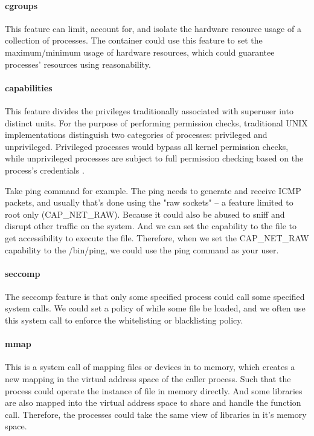 \documentclass[12pt,a4paper]{IEEEconf}
\begin{document}
\paragraph{cgroups}
This feature can limit, account for, and isolate the hardware resource usage of a
collection of processes\cite{cgroup_wiki}.
The container could use this feature to set the maximum/minimum usage of hardware
resources, which could guarantee processes' resources using reasonability.

\paragraph{capabilities}
This feature divides the privileges traditionally associated with superuser into
distinct units. For the purpose of performing permission checks, traditional UNIX
implementations distinguish two categories of processes: privileged and unprivileged.
Privileged processes would bypass all kernel permission checks, while unprivileged
processes are subject to full permission checking based on the process's credentials
\cite{capabilities}.

Take ping command for example. The ping needs to generate and receive ICMP packets,
and usually that's done using the "raw sockets" – a feature limited to root only
(CAP\_NET\_RAW). Because it could also be abused to sniff and disrupt other traffic
on the system. And we can set the capability to the file to get accessibility to
execute the file.
Therefore, when we set the CAP\_NET\_RAW capability to the /bin/ping, we could use
the ping command as your user.

\paragraph{seccomp}
The seccomp feature is that only some specified process could call some specified
system calls. We could set a policy of while some file be loaded, and we often use
this system call to enforce the whitelisting or blacklisting policy.

\paragraph{mmap}
This is a system call of mapping files or devices in to memory, which creates a
new mapping in the virtual address space of the caller process. Such that
the process could operate the instance of file in memory directly.
And some libraries are also mapped into the virtual address space to share and handle
the function call. Therefore, the processes could take the same view of libraries in
it's memory space.
\end{document}
